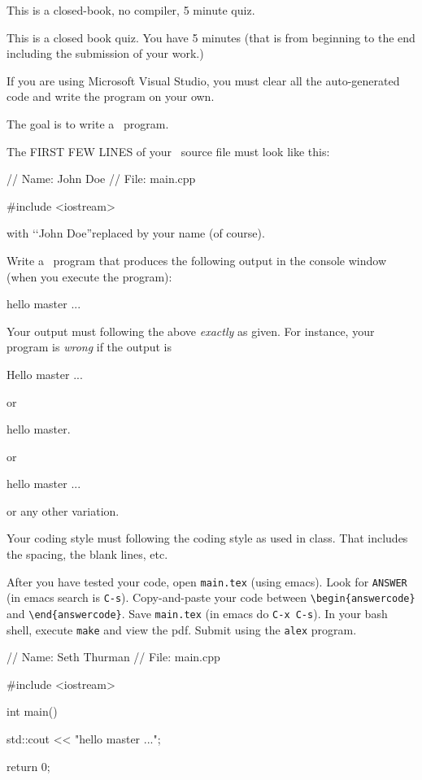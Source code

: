

This is a closed-book, no compiler, 5 minute quiz.

This is a closed book quiz.
You have 5 minutes (that is from beginning to the end including
the submission of your work.)

If you are using Microsoft Visual Studio, you must clear all the
auto-generated code and write the program on your own.

\nextq
The goal is to write a \cpp\ program.

The FIRST FEW LINES of your \cpp\ source file must look like this:
\begin{console}
// Name: John Doe
// File: main.cpp

#include <iostream>
\end{console}
with \lq\lq John Doe''replaced by your name (of course).

Write a \cpp\ program that produces the following output in the console
window (when you execute the program):
\begin{console}
hello master ...
\end{console}
Your output must following the above \textit{exactly} as given.
For instance,
your program is \textit{wrong} if the output is
\begin{console}
Hello master ...
\end{console}
or
\begin{console}
hello master.
\end{console}
or
\begin{console}
hello    master ...
\end{console}
or any other variation.

Your coding style must following the coding style as used in class.
That includes the spacing, the blank lines, etc.

After you have tested your code, open \verb!main.tex! (using emacs).
Look for \verb!ANSWER! (in emacs search is \verb!C-s!).
Copy-and-paste your code between \verb!\begin{answercode}! and
\verb!\end{answercode}!.
Save \verb!main.tex! (in emacs do \verb!C-x C-s!).
In your bash shell, execute \verb!make! and view the pdf.
Submit using the \verb!alex! program.

\ANSWER
\begin{answercode}
// Name: Seth Thurman
// File: main.cpp

#include <iostream>

int main()
{
  std::cout << "hello master ...\n";

  return 0;
}
\end{answercode}

